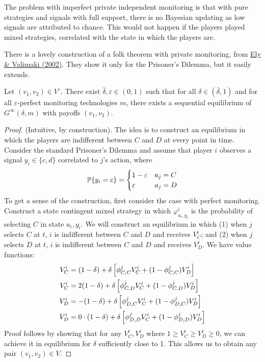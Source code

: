 \documentclass[10pt]{article}
\begin{document}
\begin{remark}
\end{remark}

\begin{remark}
	The problem with imperfect private independent monitoring is that with pure strategies and signals with full support, there is no Bayesian updating as low signals are attributed to chance. This would not happen if the players played mixed strategies, correlated with the state in which the players are.
\end{remark}

There is a lovely construction of a folk theorem with private monitoring, from \href{https://www.sciencedirect.com/science/article/pii/S0022053100927741?ref=pdf_download&fr=RR-2&rr=922d8a14ed957d16}{Ely \& Valimaki (2002)}. They show it only for the Prisoner's Dilemma, but it easily extends.

\begin{theorem}
	 Let $(v_1,v_2) \in V^\circ$. There exist $\bar{\delta},\varepsilon \in (0,1)$ such that for all $\delta \in (\bar{\delta},1)$ and for all $\varepsilon$-perfect monitoring technologies $m$, there exists a sequential equilibrium of $G^\infty(\delta,m)$ with payoffs $(v_1,v_2)$.
\end{theorem}
\begin{proof}
	(Intuitive, by construction). The idea is to construct an equilibrium in which the players are indifferent between $C$ and $D$ at every point in time. Consider the standard Prisoner's Dilemma and assume that player $i$ observes a signal $y_i \in \{c,d\}$ correlated to $j$'s action, where \[\mathbb{P}\{y_i = c\} = \begin{cases} 1- \varepsilon & a_j = C \\ \varepsilon & a_j = D\end{cases}\]To get a sense of the construction, first consider the case with perfect monitoring. Construct a state contingent mixed strategy in which $\varphi_{a_i,y_i}^i$ is the probability of selecting $C$ in state $a_i,y_i$. We will construct an equilibrium in which (1) when $j$ selects $C$ at $t$, $i$ is indifferent between $C$ and $D$ and receives $V^i_C$; and (2) when $j$ selects $D$ at $t$, $i$ is indifferent between $C$ and $D$ and receives $V^i_D$. We have value functions: \begin{align*} V_C^i &= (1-\delta) + \delta\left[ \phi^j_{C,C} V^i_C + (1-\phi^j_{C,C}) V^i_D\right] \\ V_C^i &= 2(1-\delta) + \delta \left[ \phi^j_{C,D} V^i_C + (1-\phi^j_{C,D})V^i_D\right] \\ V_D^i &= -(1-\delta) + \delta \left[ \phi^j_{D,C} V^i_C + (1-\phi^j_{D,C})V^i_D\right] \\ V_D^i &= 0 \cdot (1-\delta) + \delta \left[ \phi^j_{D,D} V^i_C + (1-\phi^j_{D,D})V^i_D\right]\end{align*}Proof follows by showing that for any $V_C^i,V_D^i$ where $1 \ge V_C^i \ge V_D^i \ge 0$, we can achieve it in equilibrium for $\delta$ sufficiently close to 1. This allows us to obtain any pair $(v_1,v_2) \in V$.
\end{proof}
\end{document}
